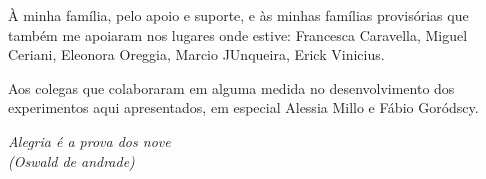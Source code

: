 \documentclass[
	12pt,				%
	openright,			%
	twoside,			%
	a4paper,			%
	english,			%
	french,				%
	spanish,			%
	brazil				%
	]{abntex2}
\begin{document}

\begin{agradecimentos}
%
À minha família, pelo apoio e suporte, e às minhas famílias provisórias que também me apoiaram nos lugares onde estive: Francesca Caravella, Miguel Ceriani, Eleonora Oreggia, Marcio JUnqueira, Erick Vinicius.

Aos colegas que colaboraram em alguma medida no desenvolvimento dos experimentos aqui apresentados, em especial Alessia Millo e Fábio Goródscy.



%
%



%
\end{agradecimentos}


\begin{epigrafe}
    \vspace*{\fill}
	\begin{flushright}
		\textit{Alegria é a prova dos nove \\(Oswald de andrade)}
	\end{flushright}
\end{epigrafe}

\end{document}
